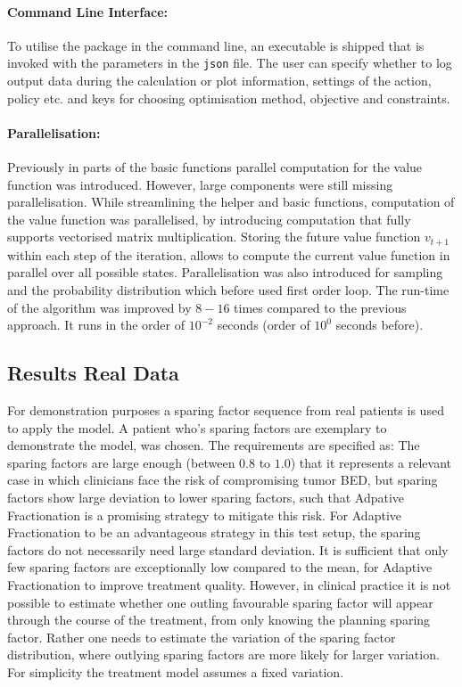 \documentclass[\relativeRoot/ada.tex]{subfiles}
\begin{document}
\paragraph{Command Line Interface:} To utilise the package in the command line, an executable is shipped that is invoked with the parameters in the \texttt{json} file. The user can specify whether to log output data during the calculation or plot information, settings of the action, policy etc. and keys for choosing optimisation method, objective  and constraints.

\paragraph{Parallelisation:} Previously in parts of the basic functions parallel computation for the value function was introduced. However, large components were still missing parallelisation. While streamlining the helper and basic functions, computation of the value function was parallelised, by introducing computation that fully supports vectorised matrix multiplication. Storing the future value function $v_{t+1}$ within each step of the iteration, allows to compute the current value function in parallel over all possible states. Parallelisation was also introduced for sampling and the probability distribution which before used first order loop. The run-time of the algorithm was improved by $8-16$ times compared to the previous approach. It runs in the order of $10^{-2}$ seconds (order of $10^{0}$ seconds before).

\subsection{Results Real Data}

For demonstration purposes a sparing factor sequence from real patients is used to apply the model. A patient who's sparing factors are exemplary to demonstrate the model, was chosen. The requirements are specified as: The sparing factors are large enough (between $0.8$ to $1.0$) that it represents a relevant case in which clinicians face the risk of compromising tumor BED, but sparing factors show large deviation to lower sparing factors, such that Adpative Fractionation is a promising strategy to mitigate this risk. For Adaptive Fractionation to be an advantageous strategy in this test setup, the sparing factors do not necessarily need large standard deviation. It is sufficient that only few sparing factors are exceptionally low compared to the mean, for Adaptive Fractionation to improve treatment quality. However, in clinical practice it is not possible to estimate whether one outling favourable sparing factor will appear through the course of the treatment, from only knowing the planning sparing factor. Rather one needs to estimate the variation of the sparing factor distribution, where outlying sparing factors are more likely for larger variation. For simplicity the treatment model assumes a fixed variation.
\end{document}
